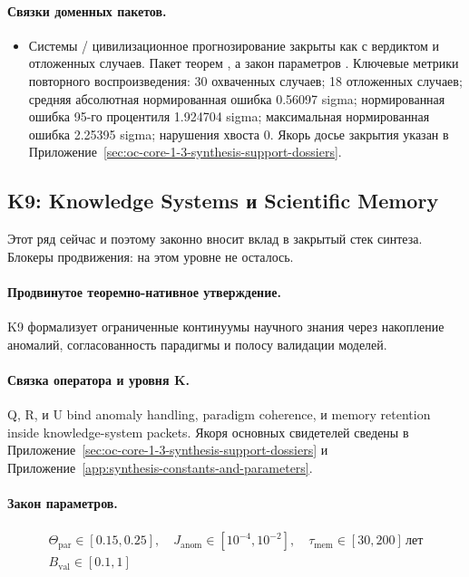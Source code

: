 \paragraph{Связки доменных пакетов.}
\begin{itemize}[leftmargin=1.6em,nosep]
\item Системы / цивилизационное прогнозирование закрыты как  с вердиктом  и  отложенных случаев. Пакет теорем , а закон параметров . Ключевые метрики повторного воспроизведения: 30 охваченных случаев; 18 отложенных случаев; средняя абсолютная нормированная ошибка 0.56097 sigma; нормированная ошибка 95-го процентиля 1.924704 sigma; максимальная нормированная ошибка 2.25395 sigma; нарушения хвоста 0. Якорь досье закрытия указан в Приложение~\ref{sec:oc-core-1-3-synthesis-support-dossiers}.
\end{itemize}

\subsection{K9: Knowledge Systems и Scientific Memory}
\label{sec:oc-core-1-3-synthesis-k9}
Этот ряд сейчас  и поэтому законно вносит вклад в закрытый стек синтеза.
Блокеры продвижения: на этом уровне не осталось.

\paragraph{Продвинутое теоремно-нативное утверждение.}
K9 формализует ограниченные континуумы научного знания через накопление аномалий, согласованность парадигмы и полосу валидации моделей.

\paragraph{Связка оператора и уровня K.}
Q, R, и U bind anomaly handling, paradigm coherence, и memory retention inside knowledge-system packets.
Якоря основных свидетелей сведены в Приложение~\ref{sec:oc-core-1-3-synthesis-support-dossiers} и Приложение~\ref{app:synthesis-constants-and-parameters}.

\paragraph{Закон параметров.}
\[
\begin{gathered} \Theta_{\mathrm{par}} \in [0.15,0.25],\quad J_{\mathrm{anom}} \in [10^{-4},10^{-2}],\quad \tau_{\mathrm{mem}} \in [30,200]\,\mathrm{лет} \\ B_{\mathrm{val}} \in [0.1,1] \end{gathered}
\]

